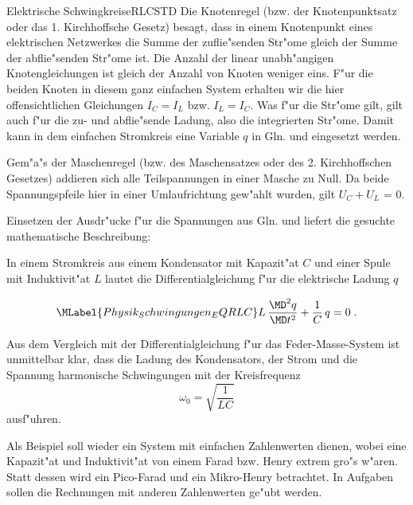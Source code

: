 \begin{MXContent}{Elektrische Schwingkreise}{RLC}{STD}
Die Knotenregel (bzw. der Knotenpunktsatz oder das 1. Kirchhoffsche Gesetz) besagt, dass in einem Knotenpunkt eines elektrischen Netzwerkes die Summe der zuflie"senden Str"ome gleich der Summe der abflie"senden Str"ome ist. Die Anzahl der linear unabh"angigen Knotengleichungen ist gleich der Anzahl von Knoten weniger eins. F"ur die beiden Knoten in diesem ganz einfachen System erhalten wir die hier offensichtlichen Gleichungen $I_C=I_L$ bzw. $I_L=I_C$. Was f"ur die Str"ome gilt, gilt auch f"ur die zu- und abflie"sende Ladung, also die integrierten Str"ome. Damit kann in dem einfachen Stromkreis eine Variable $q$ in Gln.  und  eingesetzt werden. 

Gem"a"s der Maschenregel (bzw. des Maschensatzes oder des 2. Kirchhoffschen Gesetzes) addieren sich alle Teilspannungen in einer Masche zu Null. Da beide Spannungspfeile hier in einer Umlaufrichtung gew"ahlt wurden, gilt $U_C+U_L$ = 0.

Einsetzen der Ausdr"ucke f"ur die Spannungen aus Gln.  und  liefert die gesuchte mathematische Beschreibung:

\begin{MInfo}
In einem Stromkreis aus einem Kondensator mit Kapazit"at $C$ und einer Spule mit Induktivit"at $L$ lautet die Differentialgleichung f"ur die elektrische Ladung $q$

\begin{equation}\MLabel{Physik_Schwingungen_EQRLC}
  L\, \frac{\MD^2 q }{\MD t^2} + \frac{1}{C}\, q = 0 \; .
\end{equation}

Aus dem Vergleich mit der Differentialgleichung f"ur das Feder-Masse-System ist unmittelbar klar, dass die Ladung des Kondensators, der Strom und die Spannung harmonische Schwingungen mit der Kreisfrequenz
\begin{equation}
  \omega_0 = \sqrt{\frac{1}{L C}}
\end{equation}
ausf"uhren.
\end{MInfo}

Als Beispiel soll wieder ein System mit einfachen Zahlenwerten dienen, wobei eine Kapazit"at und Induktivit"at von einem Farad bzw. Henry extrem gro"s w"aren. Statt dessen wird ein Pico-Farad und ein Mikro-Henry betrachtet. In Aufgaben sollen die Rechnungen mit anderen Zahlenwerten ge"ubt werden.


\end{MXContent}
